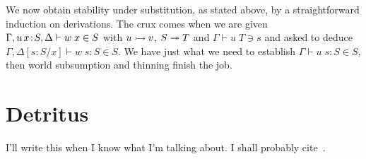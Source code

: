\documentclass{sigplanconf}
\begin{document}
We now obtain stability under substitution, as stated above, by a
straightforward induction on derivations. The crux comes when we are
given $\Gamma,u\,x\!:\! S,\Delta\vdash w\;x\in S$ with $u\rightarrowtail v$, $S\twoheadrightarrow T$ and
$\Gamma\vdash u\;T\ni s$ and asked to deduce
$\Gamma,\Delta[s:S/x]\vdash w\;s:S\in S$. We have just what we need to
establish $\Gamma\vdash u\;s:S\in S$, then world subsumption and
thinning finish the job.

\section{Detritus}

I'll write this when I know what I'm talking about. I shall probably
cite~\cite{brady:indices}.



\end{document}
